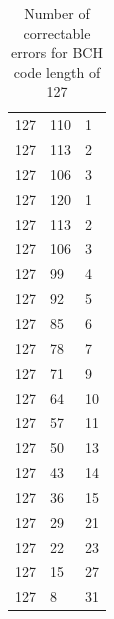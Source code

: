 \begin{table}
\begin{tabular}{lll}
\hline
127 & 110 &   1 \\
127 & 113 &   2 \\
127 & 106 &   3 \\
127 & 120 &   1 \\
127 & 113 &   2 \\
127 & 106 &   3 \\
127 &  99 &   4 \\
127 &  92 &   5 \\
127 &  85 &   6 \\
127 &  78 &   7 \\
127 &  71 &   9 \\
127 &  64 &  10 \\
127 &  57 &  11 \\
127 &  50 &  13 \\
127 &  43 &  14 \\
127 &  36 &  15 \\
127 &  29 &  21 \\
127 &  22 &  23 \\
127 &  15 &  27 \\
127 &   8 &  31
\end{tabular}
\caption{Number of correctable errors for BCH code length of 127}
\end{table}

